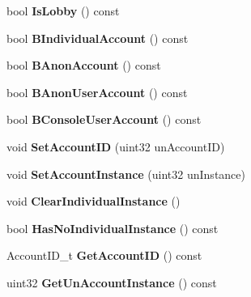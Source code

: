 \begin{DoxyCompactItemize}
\item 
\mbox{\label{class_c_steam_i_d_a11d9937ee2fe53635d90f984d91c2fe2}} 
bool {\bfseries Is\+Lobby} () const
\item 
\mbox{\label{class_c_steam_i_d_ac0b95721d449cfee9361f220771b42ac}} 
bool {\bfseries B\+Individual\+Account} () const
\item 
\mbox{\label{class_c_steam_i_d_a5fbe10e5f97138a72c8567bdb4ce8821}} 
bool {\bfseries B\+Anon\+Account} () const
\item 
\mbox{\label{class_c_steam_i_d_afed71fb948a0b4d9181e4b321e2c5b09}} 
bool {\bfseries B\+Anon\+User\+Account} () const
\item 
\mbox{\label{class_c_steam_i_d_a1c0603a945b3ea0366c8de2b79058230}} 
bool {\bfseries B\+Console\+User\+Account} () const
\item 
\mbox{\label{class_c_steam_i_d_ac13793c8698c2b16e63a67c00a517413}} 
void {\bfseries Set\+Account\+ID} (uint32 un\+Account\+ID)
\item 
\mbox{\label{class_c_steam_i_d_a37af4231ff27a0d38cd40185f8e8b971}} 
void {\bfseries Set\+Account\+Instance} (uint32 un\+Instance)
\item 
\mbox{\label{class_c_steam_i_d_a114440392aba5cc7f62ebdc3983c54d4}} 
void {\bfseries Clear\+Individual\+Instance} ()
\item 
\mbox{\label{class_c_steam_i_d_a7c8b30561f318a662e5fffc05127ac6c}} 
bool {\bfseries Has\+No\+Individual\+Instance} () const
\item 
\mbox{\label{class_c_steam_i_d_ad9448c037b8c15dec052ad569f1e610e}} 
Account\+I\+D\+\_\+t {\bfseries Get\+Account\+ID} () const
\item 
\mbox{\label{class_c_steam_i_d_a9049bae00363a22b65f790ec14f3bcdf}} 
uint32 {\bfseries Get\+Un\+Account\+Instance} () const
\item 
\mbox{\label{class_c_steam_i_d_ad22f73a9ba4474d1a70a7e5813f5b67a}} 

\end{DoxyCompactItemize}
